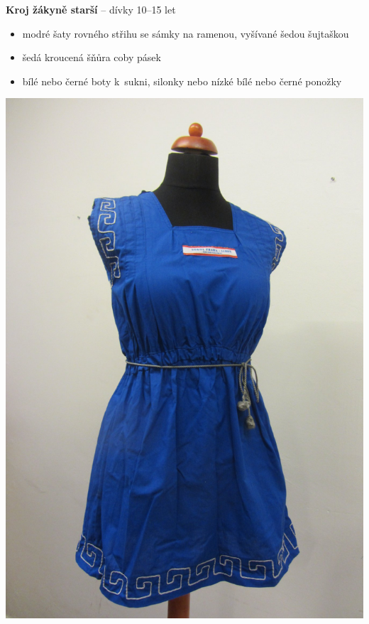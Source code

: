 \documentclass[11pt]{article}
\begin{document}
\vspace*{24pt}

\begin{minipage}{0.6\linewidth}
  \center
  \textbf{Kroj žákyně starší} – dívky 10–15 let
  
  \begin{itemize}[itemsep=-3pt,leftmargin=2em]
    \item modré šaty rovného střihu se sámky na ramenou, vyšívané šedou šujtaškou
    \item šedá kroucená šňůra coby pásek
    \item bílé nebo černé \luv{}boty k~sukni\ruv{}, silonky nebo nízké bílé nebo černé ponožky
  \end{itemize}
\end{minipage}
\begin{minipage}{0.3\linewidth}
  \hspace*{1em}
  \includegraphics[width=0.98\linewidth]{kroj_st_zakyne.png} 
\end{minipage}
\end{document}
